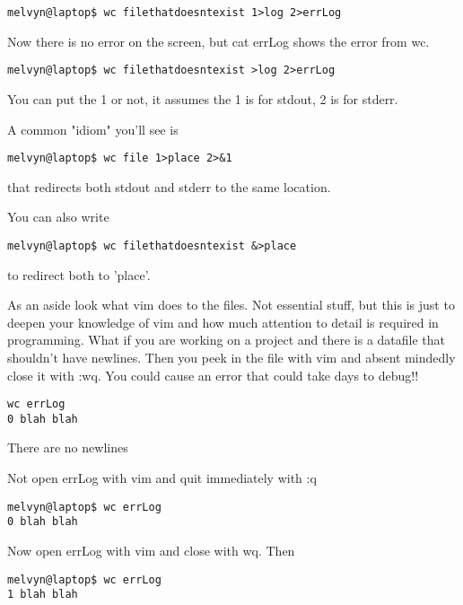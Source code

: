 \documentclass[12pt,a4paper]{article}
\begin{document}
\begin{lstlisting}[style=term]
melvyn@laptop$ wc filethatdoesntexist 1>log 2>errLog
\end{lstlisting}

 Now there is no error on the screen, but cat errLog shows the error from wc.

\begin{lstlisting}[style=term]
melvyn@laptop$ wc filethatdoesntexist >log 2>errLog
\end{lstlisting}

 You can put the 1 or not, it assumes the 1 is for stdout, 2 is for stderr.

A common "idiom" you'll see is

\begin{lstlisting}[style=term]
melvyn@laptop$ wc file 1>place 2>&1
\end{lstlisting}

 that redirects both stdout and stderr to the same location.

You can also write 
\begin{lstlisting}[style=term]
melvyn@laptop$ wc filethatdoesntexist &>place
\end{lstlisting}

 to redirect both to 'place'.

As an aside look what vim does to the files. Not essential stuff, but this is just to deepen your knowledge of vim and how much attention to detail is required in programming. What if you are working on a project and there is a datafile that shouldn't have newlines. Then you peek in the file with vim and absent mindedly close it with :wq. You could cause an error that could take days to debug!!

\begin{lstlisting}[style=term]
wc errLog
0 blah blah
\end{lstlisting}

There are no newlines

Not open errLog with vim and quit immediately with :q

\begin{lstlisting}[style=term]
melvyn@laptop$ wc errLog
0 blah blah
\end{lstlisting}

Now open errLog with vim and close with wq. Then 

\begin{lstlisting}[style=term]
melvyn@laptop$ wc errLog
1 blah blah
\end{lstlisting}
\end{document}
